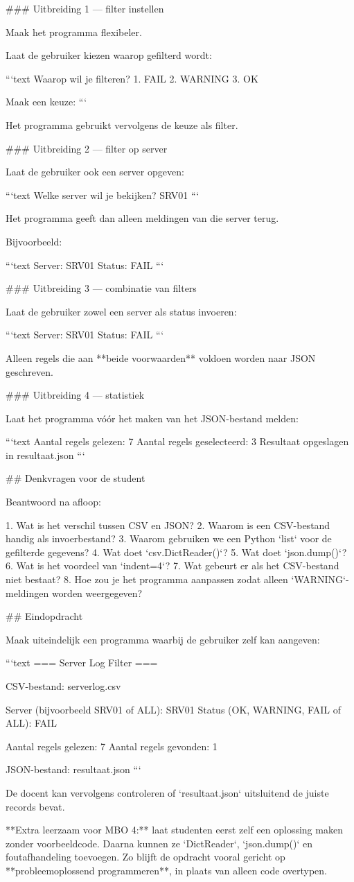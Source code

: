 ### Uitbreiding 1 — filter instellen

Maak het programma flexibeler.

Laat de gebruiker kiezen waarop gefilterd wordt:

```text
Waarop wil je filteren?
1. FAIL
2. WARNING
3. OK

Maak een keuze:
```

Het programma gebruikt vervolgens de keuze als filter.

### Uitbreiding 2 — filter op server

Laat de gebruiker ook een server opgeven:

```text
Welke server wil je bekijken?
SRV01
```

Het programma geeft dan alleen meldingen van die server terug.

Bijvoorbeeld:

```text
Server: SRV01
Status: FAIL
```

### Uitbreiding 3 — combinatie van filters

Laat de gebruiker zowel een server als status invoeren:

```text
Server: SRV01
Status: FAIL
```

Alleen regels die aan **beide voorwaarden** voldoen worden naar JSON geschreven.

### Uitbreiding 4 — statistiek

Laat het programma vóór het maken van het JSON-bestand melden:

```text
Aantal regels gelezen: 7
Aantal regels geselecteerd: 3
Resultaat opgeslagen in resultaat.json
```

## Denkvragen voor de student

Beantwoord na afloop:

1. Wat is het verschil tussen CSV en JSON?
2. Waarom is een CSV-bestand handig als invoerbestand?
3. Waarom gebruiken we een Python `list` voor de gefilterde gegevens?
4. Wat doet `csv.DictReader()`?
5. Wat doet `json.dump()`?
6. Wat is het voordeel van `indent=4`?
7. Wat gebeurt er als het CSV-bestand niet bestaat?
8. Hoe zou je het programma aanpassen zodat alleen `WARNING`-meldingen worden weergegeven?

## Eindopdracht

Maak uiteindelijk een programma waarbij de gebruiker zelf kan aangeven:

```text
=== Server Log Filter ===

CSV-bestand: serverlog.csv

Server (bijvoorbeeld SRV01 of ALL): SRV01
Status (OK, WARNING, FAIL of ALL): FAIL

Aantal regels gelezen: 7
Aantal regels gevonden: 1

JSON-bestand: resultaat.json
```

De docent kan vervolgens controleren of `resultaat.json` uitsluitend de juiste records bevat.

**Extra leerzaam voor MBO 4:** laat studenten eerst zelf een oplossing maken zonder voorbeeldcode. Daarna kunnen ze `DictReader`, `json.dump()` en foutafhandeling toevoegen. Zo blijft de opdracht vooral gericht op **probleemoplossend programmeren**, in plaats van alleen code overtypen.

